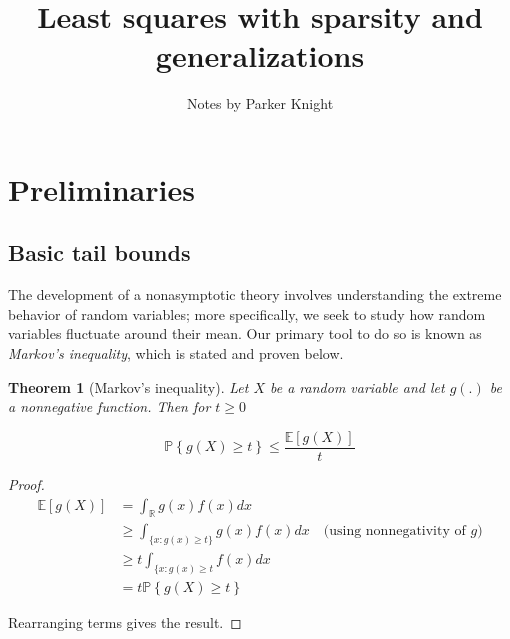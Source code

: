 \documentclass{article}
\title{Least squares with sparsity and generalizations}
\author{Notes by Parker Knight}
\newcommand{\R}{\mathbb{R}}
\newcommand{\ev}[1]{\mathbb{E}\left[#1\right]}
\newcommand{\prob}[1]{\mathbb{P}\left\{#1\right\}}
\newtheorem{theorem}{Theorem}
\begin{document}
\maketitle


\section{Preliminaries}

\subsection{Basic tail bounds}

The development of a nonasymptotic theory involves understanding the extreme
behavior of random variables; more specifically, we seek to study how random
variables fluctuate around their mean. Our primary tool to do so is known as
\textit{Markov's inequality}, which is stated and proven below.

\begin{theorem}[Markov's inequality]
	Let $X$ be a random variable and let $g(.)$ be a
	nonnegative function. Then for $t \geq 0$

	$$\prob{g(X) \geq t} \leq \frac{\ev{g(X)}}{t}$$
\end{theorem}

\begin{proof}
	\begin{align*}
		\ev{g(X)} &= \int_{\R}g(x)f(x)dx \\ 
		&\geq \int_{\{x: g(x) \geq t\}}g(x)f(x)dx \quad \textrm{(using nonnegativity of $g$)} \\
		&\geq t\int_{\{x : g(x) \geq t}f(x)dx \\
		&= t\prob{g(X) \geq t}
	\end{align*}

	Rearranging terms gives the result.
\end{proof}
\end{document}
